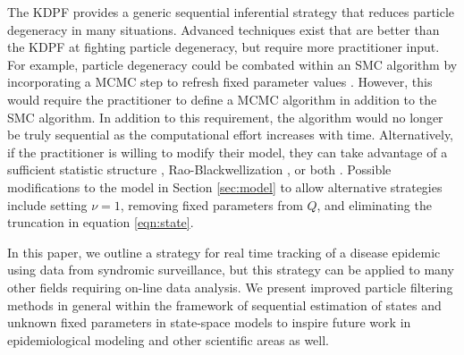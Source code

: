 \documentclass{elsarticle}
\begin{document}
The KDPF provides a generic sequential inferential strategy that reduces particle degeneracy in many situations. Advanced techniques exist that are better than the KDPF at fighting particle degeneracy, but require more practitioner input. For example, particle degeneracy could be combated within an SMC algorithm by incorporating a MCMC step to refresh fixed parameter values \citep{Gilk:Berz:foll:2001,Stor:part:2002}. However, this would require the practitioner to define a MCMC algorithm in addition to the SMC algorithm. In addition to this requirement, the algorithm would no longer be truly sequential as the computational effort increases with time. Alternatively, if the practitioner is willing to modify their model, they can take advantage of a sufficient statistic structure \citep{Fear:mark:2002}, Rao-Blackwellization \citep{Douc:Gods:Andr:on:2000}, or both \citep{carvalho2010particle}. Possible modifications to the model in Section \ref{sec:model} to allow alternative strategies include setting $\nu=1$, removing fixed parameters from $Q$, and eliminating the truncation in equation \eqref{eqn:state}.

In this paper, we outline a strategy for real time tracking of a disease epidemic using data from syndromic surveillance, but this strategy can be applied to many other fields requiring on-line data analysis. We present improved particle filtering methods in general within the framework of sequential estimation of states and unknown fixed parameters in state-space models to inspire future work in epidemiological modeling and other scientific areas as well.

\clearpage



\end{document}
